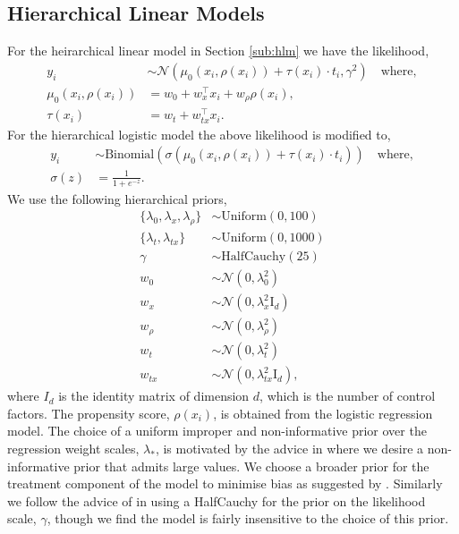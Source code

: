 \documentclass[12pt, a4paper]{article}
\begin{document}
\subsection{Hierarchical Linear Models}

For the heirarchical linear model in Section \ref{sub:hlm} we have the likelihood,
\begin{align*}
y_i &\sim \mathcal{N}\!\left(
  \mu_0(x_i, \rho(x_i)) + \tau(x_i)\cdot t_i, 
  \gamma^2\right) 
  \quad\textrm{where}, \\
\mu_0(x_i, \rho(x_i)) &= w_0 + w_x^\top x_i + w_\rho \rho(x_i), \\
\tau(x_i) &= w_t + w_{tx}^\top x_i.
\end{align*}
For the hierarchical logistic model the above likelihood is modified to,
\begin{align*}
y_i &\sim \mathrm{Binomial}\!\left(
  \sigma\!\left(\mu_0(x_i, \rho(x_i)) + \tau(x_i)\cdot t_i \right) \right)
  \quad\textrm{where}, \\
  \sigma(z) &= \frac{1}{1 + e^{-z}}.
\end{align*}
We use the following hierarchical priors,
\begin{align*}
  \{\lambda_0, \lambda_x, \lambda_\rho\} &\sim \textrm{Uniform}(0, 100) \\
  \{\lambda_t, \lambda_{tx}\} &\sim \textrm{Uniform}(0, 1000) \\
  \gamma &\sim \textrm{HalfCauchy}(25) \\
  w_0 &\sim \mathcal{N}(0,\lambda_0^2) \\
  w_x &\sim \mathcal{N}(0,\lambda_x^2 \textrm{I}_d) \\
  w_\rho &\sim \mathcal{N}(0,\lambda_\rho^2) \\
  w_t &\sim \mathcal{N}(0,\lambda_t^2) \\
  w_{tx} &\sim \mathcal{N}(0,\lambda^2_{tx} \textrm{I}_d),
\end{align*}
where $I_d$ is the identity matrix of dimension $d$, which is the number of
control factors. The propensity score, $\rho(x_i)$, is obtained from the
logistic regression model. 
The choice of a uniform improper and non-informative prior over the regression
weight scales, $\lambda_*$, is motivated by the advice in \citet{gelman2006}
where we desire a non-informative prior that admits large values. We choose a
broader prior for the treatment component of the model to minimise bias as
suggested by \cite{hahn2020}. Similarly we follow the advice of
\citet{gelman2006} in using a HalfCauchy for the prior on the likelihood
scale, $\gamma$, though we find the model is fairly insensitive to the
choice of this prior.
\end{document}
